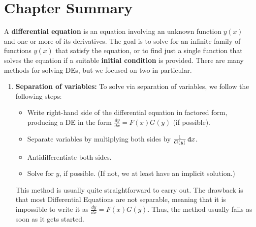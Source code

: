\section{Chapter Summary}

A {\bf differential equation} is an equation involving an unknown function $y(x)$ and one or more of its derivatives.  The goal is to solve for an infinite family of functions $y(x)$ that satisfy the equation, or to find just a single function that solves the equation if a suitable {\bf initial condition} is provided.  There are many methods for solving DEs, but we focused on two in particular.  

\begin{enumerate}
\item {\bf Separation of variables:} To solve via separation of variables, we follow the following steps:
\begin{itemize}
\item Write right-hand side of the differential equation in factored form, producing a DE in the form $ \frac{dy}{dx}=F(x)G(y)$ (if possible). 
\item Separate variables by multiplying both sides by $\frac{1}{G(y)}\mathop{}\!\mathtt{d} x$.
\item Antidifferentiate both sides.   
\item Solve for $y$, if possible.  (If not, we at least have an implicit solution.)
\end{itemize}
This method is usually quite straightforward to carry out.  The drawback is that most Differential Equations are not separable, meaning that it is impossible to write it as $ \frac{dy}{dx}=F(x)G(y)$.  Thus, the method usually fails as soon as it gets started.


\end{enumerate}
